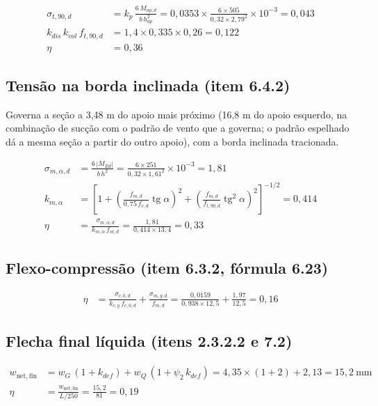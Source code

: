 \begin{align}
    \sigma_{t,90,d} &= k_p\,\frac{6\,M_{ap,d}}{b\,h_{ap}^2} = 0{,}0353 \times \frac{6 \times 505}{0{,}32 \times 2{,}79^2} \times 10^{-3} = 0{,}043 \nonumber \\
    k_{dis}\,k_{vol}\,f_{t,90,d} &= 1{,}4 \times 0{,}335 \times 0{,}26 = 0{,}122 \nonumber \\
    \eta &= 0{,}36
    \label{eq:mem-cumeeira}
\end{align}
\subsection*{Tensão na borda inclinada (item 6.4.2)}

Governa a seção a 3{,}48 m do apoio mais próximo (16{,}8 m do apoio esquerdo, na combinação de sucção com o padrão de vento que a governa; o padrão espelhado dá a mesma seção a partir do outro apoio), com a borda inclinada tracionada.

\begin{align}
    \sigma_{m,\alpha,d} &= \frac{6\,|M_{Ed}|}{b\,h^2} = \frac{6 \times 251}{0{,}32 \times 1{,}61^2} \times 10^{-3} = 1{,}81 \nonumber \\
    k_{m,\alpha} &= \left[1 + \left(\frac{f_{m,d}}{0{,}75\,f_{v,d}}\operatorname{tg}\alpha\right)^2 + \left(\frac{f_{m,d}}{f_{t,90,d}}\operatorname{tg}^2\alpha\right)^2\right]^{-1/2} = 0{,}414 \nonumber \\
    \eta &= \frac{\sigma_{m,\alpha,d}}{k_{m,\alpha}\,f_{m,d}} = \frac{1{,}81}{0{,}414 \times 13{,}4} = 0{,}33
    \label{eq:mem-borda-inclinada}
\end{align}
\subsection*{Flexo-compressão (item 6.3.2, fórmula 6.23)}

\begin{align}
    \eta &= \frac{\sigma_{c,0,d}}{k_{c,y}\,f_{c,0,d}} + \frac{\sigma_{m,y,d}}{f_{m,d}} = \frac{0{,}0159}{0{,}938 \times 12{,}5} + \frac{1{,}97}{12{,}5} = 0{,}16
    \label{eq:mem-flexocompressao}
\end{align}
\subsection*{Flecha final líquida (itens 2.3.2.2 e 7.2)}

\begin{align}
    w_{\mathrm{net,fin}} &= w_G\,(1 + k_{def}) + w_Q\,(1 + \psi_2\,k_{def}) = 4{,}35 \times (1 + 2) + 2{,}13 = 15{,}2~\text{mm} \nonumber \\
    \eta &= \frac{w_{\mathrm{net,fin}}}{L/250} = \frac{15{,}2}{81} = 0{,}19
    \label{eq:mem-flecha}
\end{align}
